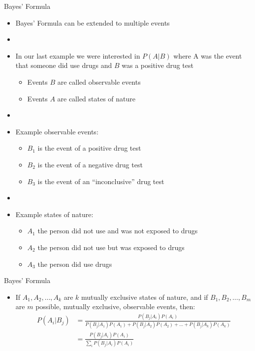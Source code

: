 \documentclass[xcolor=dvipsnames]{beamer}
\begin{document}
\begin{frame}{Bayes' Formula}

\begin{itemize}
	\item Bayes' Formula can be extended to multiple events
	\item[]
	\item In our last example we were interested in $P(A|B)$ where A was the event that someone did use drugs and $B$ was a positive drug test
	\begin{itemize}
		\item Events $B$ are called observable events
		\item Events $A$ are called states of nature
	\end{itemize}
	\item[]
	\item Example observable events:
	\begin{itemize}
		\item $B_1$ is the event of a positive drug test
		\item $B_2$ is the event of a negative drug test
		\item $B_3$ is the event of an ``inconclusive'' drug test
	\end{itemize}
	\item[]
	\item Example states of nature:
	\begin{itemize}
		\item $A_1$ the person did not use and was not exposed to drugs
		\item $A_2$ the person did not use but was exposed to drugs
		\item $A_3$ the person did use drugs
	\end{itemize}
	
\end{itemize}
\end{frame}

\begin{frame}{Bayes' Formula}
	\begin{itemize}
		\item If $A_1, A_2, \hdots, A_k$ are $k$ mutually exclusive states of nature, and if $B_1, B_2, \hdots, B_m$ are $m$ possible, mutually exclusive, observable events, then:
		\begin{align*}
		P(A_i|B_j) &= \frac{P(B_j|A_i)P(A_i)}{P(B_j|A_1)P(A_1) + P(B_j|A_2)P(A_2) + \hdots + P(B_j|A_k)P(A_k)} \\
		&= \frac{P(B_j|A_i)P(A_i)}{\sum_i P(B_j|A_i)P(A_i)}
		\end{align*}
	\end{itemize}
\end{frame}
\end{document}
